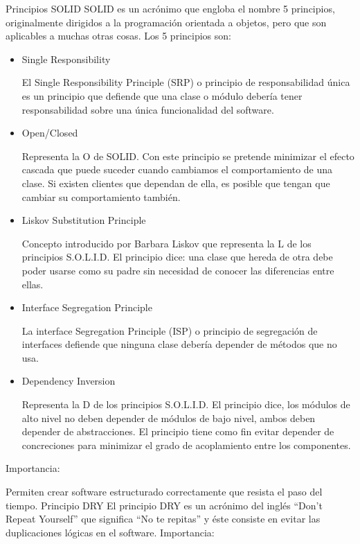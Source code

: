 \documentclass{article}
\begin{document}
Principios SOLID
\newline 
\newline
SOLID es un acrónimo que engloba el nombre 5 principios, originalmente dirigidos a la programación orientada a objetos, pero que son aplicables a muchas otras cosas. Los 5 principios son:  
\newline
\begin{itemize}
    \item Single Responsibility 

    El Single Responsibility Principle (SRP) o principio de responsabilidad única es un principio que defiende que una clase o módulo debería tener responsabilidad sobre una única funcionalidad del software. 

    \item Open/Closed 

    Representa la O de SOLID. Con este principio se pretende minimizar el efecto cascada que puede suceder cuando cambiamos el comportamiento de una clase. Si existen clientes que dependan de ella, es posible que tengan que cambiar su comportamiento también. 

    \item Liskov Substitution Principle 

    Concepto introducido por Barbara Liskov que representa la L de los principios S.O.L.I.D. El principio dice: una clase que hereda de otra debe poder usarse como su padre sin necesidad de conocer las diferencias entre ellas. 

    \item Interface Segregation Principle 

    La interface Segregation Principle (ISP) o principio de segregación de interfaces defiende que ninguna clase debería depender de métodos que no usa. 

    \item Dependency Inversion 

    Representa la D de los principios S.O.L.I.D. El principio dice, los módulos de alto nivel no deben depender de módulos de bajo nivel, ambos deben depender de abstracciones. El principio tiene como fin evitar depender de concreciones para minimizar el grado de acoplamiento entre los componentes. 

\end{itemize} 

Importancia:
\newline

\linebreak Permiten crear software estructurado correctamente que resista el paso del tiempo.
\newline
\newline
Principio DRY 
\newline
\newline
El principio DRY es un acrónimo del inglés “Don’t Repeat Yourself” que significa “No te repitas” y éste consiste en evitar las duplicaciones lógicas en el software. 
\newline 
\newline 
Importancia: 
\end{document}
